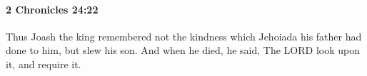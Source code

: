 
		\paragraph{2 Chronicles 24:22} %
			\label{2CHRONICLES-24-22}

			Thus Joash the king remembered not the kindness which Jehoiada his father had done to him, but slew his son. And when he died, he said, The LORD look upon it, and require it.


